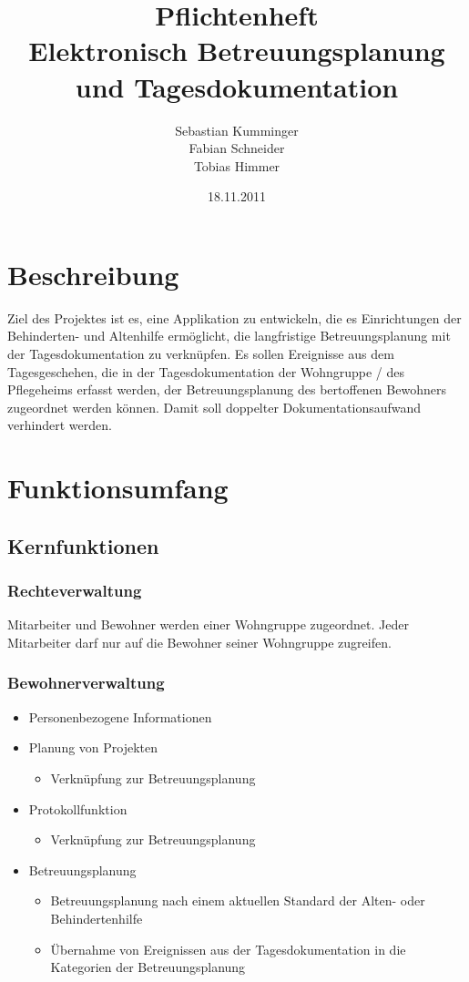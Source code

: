 \documentclass[a4paper,10pt]{article}
\author{Sebastian Kumminger\\
	Fabian Schneider\\
	Tobias Himmer}
\title{Pflichtenheft\\
	Elektronisch Betreuungsplanung und Tagesdokumentation}
\date{18.11.2011}
\begin{document}
\maketitle

\tableofcontents
\newpage
\section{Beschreibung}
Ziel des Projektes ist es, eine Applikation zu entwickeln, die es Einrichtungen der Behinderten- und Altenhilfe ermöglicht, die langfristige Betreuungsplanung mit der Tagesdokumentation zu verknüpfen. Es sollen Ereignisse aus dem Tagesgeschehen, die in der Tagesdokumentation der Wohngruppe / des Pflegeheims erfasst werden, der Betreuungsplanung des bertoffenen Bewohners zugeordnet werden können. Damit soll doppelter Dokumentationsaufwand verhindert werden.

\section{Funktionsumfang}

\subsection{Kernfunktionen}

\subsubsection{Rechteverwaltung}
Mitarbeiter und Bewohner werden einer Wohngruppe zugeordnet. Jeder Mitarbeiter darf nur auf die Bewohner seiner Wohngruppe zugreifen.

\subsubsection{Bewohnerverwaltung}
\begin{itemize}
	\item Personenbezogene Informationen
	\item Planung von Projekten
	\begin{itemize}
		\item Verknüpfung zur Betreuungsplanung
	\end{itemize}
	\item Protokollfunktion
	\begin{itemize}
		\item Verknüpfung zur Betreuungsplanung
	\end{itemize}
	\item  Betreuungsplanung
	\begin{itemize}
		\item Betreuungsplanung nach einem aktuellen Standard der Alten- oder Behindertenhilfe
		\item Übernahme von Ereignissen aus der Tagesdokumentation in die Kategorien der Betreuungsplanung
	\end{itemize}
\end{itemize}
\end{document}

